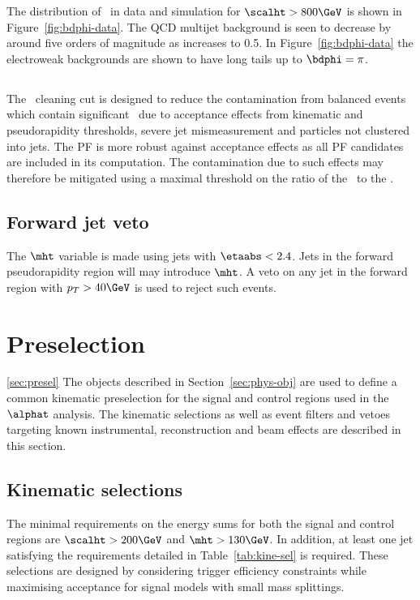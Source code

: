 The distribution of \bdphi~in data and simulation for $\scalht > 800\GeV$ is shown in Figure~\ref{fig:bdphi-data}.
The QCD multijet background is seen to decrease by around five orders of magnitude as \bdphi increases
to 0.5. In Figure~\ref{fig:bdphi-data} the electroweak backgrounds are
shown to have long tails up to $\bdphi = \pi$.

\subsection{\mhtmet}
\label{sec:mhtmet}
The \mhtmet~cleaning cut is designed to reduce the contamination from balanced events
which contain significant \mht~due to acceptance effects from kinematic and 
pseudorapidity thresholds, severe jet mismeasurement and particles not 
clustered into jets. The PF \met is more robust against acceptance effects as all PF candidates are
included in its computation. The contamination due to such effects may therefore be mitigated 
using a maximal threshold on the ratio of the \mht~to the \met.

\subsection{Forward jet veto}
\label{sec:fwd_jet_veto}
The $\mht$ variable is made using jets with $\etaabs < 2.4$. Jets in the forward pseudorapidity 
region will may introduce $\mht$. A veto on any jet in the forward region with $p_T > 40\GeV$
is used to reject such events. 

\section{Preselection}
\ref{sec:presel}
The objects described in Section~\ref{sec:phys-obj} are used to define a common kinematic 
preselection for the signal and control regions used in the $\alphat$ analysis. 
The kinematic selections as well as event filters and vetoes targeting
known instrumental, reconstruction and beam effects are described in this section.

\subsection{Kinematic selections}
The minimal requirements on the energy sums for both the signal and control regions are
$\scalht > 200\GeV$ and $\mht > 130\GeV$. In addition, at least one jet satisfying the 
requirements detailed in Table~\ref{tab:kine-sel} is required. These selections are 
designed by considering trigger efficiency constraints while maximising acceptance for
signal models with small mass splittings.

